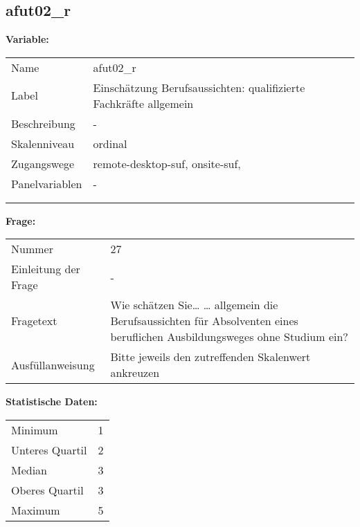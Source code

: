 	
	
	\subsection{afut02\_r}
	\label{subSection:afut02_r}

	\noindent\textbf{Variable:}\\
		\begin{tabular}{lL{11.3cm}}
			\label{tableVariable:afut02_r}
			Name & afut02\_r \\
			Label & Einschätzung Berufsaussichten: qualifizierte Fachkräfte allgemein \\
			Beschreibung & - \\
			Skalenniveau & ordinal \\
			Zugangswege &
				remote-desktop-suf,
				onsite-suf,
 \\
			Panelvariablen & -
			 \\
			 \\
 \\
		\end{tabular}

		\vspace*{1 cm}
		\noindent\textbf{Frage:}\\
		\begin{tabular}{lL{11.3cm}}
			\label{tableQuestion:afut02_r}
			Nummer & 27 \\
			Einleitung der Frage & - \\
			Fragetext & Wie schätzen Sie…
… allgemein die Berufsaussichten für Absolventen eines beruflichen Ausbildungsweges ohne Studium ein? \\
			Ausfüllanweisung & Bitte jeweils den zutreffenden
Skalenwert ankreuzen \\
		\end{tabular}


		\vspace*{1 cm}
		\noindent\textbf{Statistische Daten:}\\
			\begin{tabular}{ll}
				\label{tableStatistics:afut02_r}
					Minimum & 1 \\
					Unteres Quartil & 2 \\
					Median & 3 \\
					Oberes Quartil & 3 \\
					Maximum & 5 \\
			\end{tabular}



